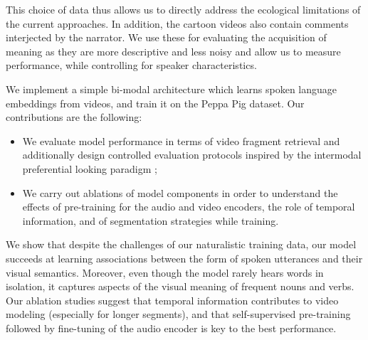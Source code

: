 This choice of data thus allows us to directly address the ecological limitations 
of the current approaches. In addition, the cartoon videos also contain 
comments interjected by the narrator. We use these for evaluating the 
acquisition of meaning as they are more descriptive and less noisy and allow 
us to measure performance, while controlling for speaker characteristics.

We implement a simple bi-modal architecture which learns spoken
language embeddings from videos, and train it on the Peppa Pig dataset.
Our contributions are the following:
\begin{itemize}
\item We evaluate model performance in terms of video fragment
  retrieval and additionally design controlled evaluation
  protocols inspired by the intermodal preferential looking
  paradigm \citep{hirsh1996intermodal};
\item We carry out ablations of model components in order to
  understand the effects of pre-training for the audio and video
  encoders, the role of temporal information, and of segmentation
  strategies while training. 
\end{itemize}
We show that despite the challenges of our naturalistic training data,
our model succeeds at learning associations between the form of spoken 
utterances and their visual semantics. Moreover, even though the model 
rarely hears words in isolation, it captures aspects of the visual meaning 
of frequent nouns and verbs.
Our ablation studies suggest that temporal information contributes
to video modeling (especially for longer segments), and that self-supervised pre-training
followed by fine-tuning of the audio encoder is key to the best
performance.



